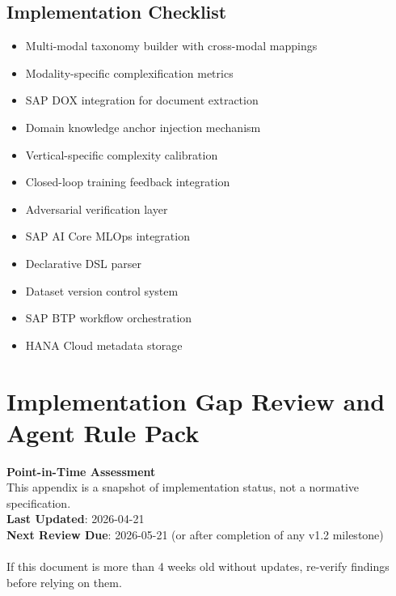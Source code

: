 \documentclass[12pt,a4paper,twoside]{report}
\begin{document}
\section{Implementation Checklist}

\begin{itemize}
\item[\texttt{[ ]}] Multi-modal taxonomy builder with cross-modal mappings
\item[\texttt{[ ]}] Modality-specific complexification metrics
\item[\texttt{[ ]}] SAP DOX integration for document extraction
\item[\texttt{[ ]}] Domain knowledge anchor injection mechanism
\item[\texttt{[ ]}] Vertical-specific complexity calibration
\item[\texttt{[ ]}] Closed-loop training feedback integration
\item[\texttt{[ ]}] Adversarial verification layer
\item[\texttt{[ ]}] SAP AI Core MLOps integration
\item[\texttt{[ ]}] Declarative DSL parser
\item[\texttt{[ ]}] Dataset version control system
\item[\texttt{[ ]}] SAP BTP workflow orchestration
\item[\texttt{[ ]}] HANA Cloud metadata storage
\end{itemize}

\appendix
\chapter{Implementation Gap Review and Agent Rule Pack}
\label{chap:simula-gap-review}

\begin{warningbox}
\textbf{Point-in-Time Assessment}\\
This appendix is a snapshot of implementation status, not a normative specification.\\
\textbf{Last Updated}: 2026-04-21\\
\textbf{Next Review Due}: 2026-05-21 (or after completion of any v1.2 milestone)\\
\\
If this document is more than 4 weeks old without updates, re-verify findings before relying on them.
\end{warningbox}
\end{document}

